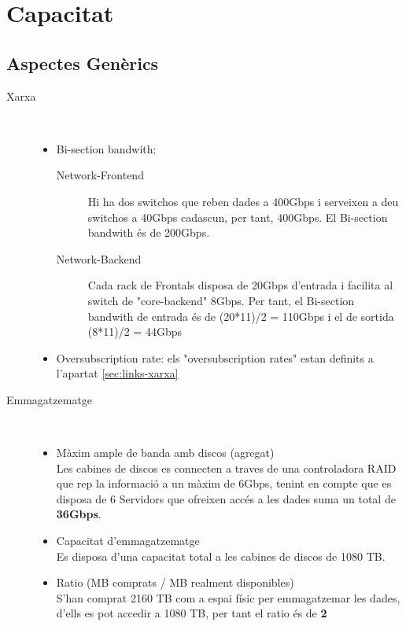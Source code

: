 \section{Capacitat}

\subsection{Aspectes Genèrics}

\begin{description}
    \item[Xarxa] \hfill \\
        \vspace{-5mm}
        \begin{itemize}[leftmargin=*]
            \item Bi-section bandwith:
                \begin{description}
                    \item[Network-Frontend] Hi ha dos switchos que reben dades a 400Gbps i serveixen a deu switchos a 40Gbps cadascun, per tant, 400Gbps. El Bi-section bandwith és de 200Gbps.
                    \item[Network-Backend] Cada rack de Frontals disposa de 20Gbps d'entrada i facilita al switch de "core-backend" 8Gbps. Per tant, el Bi-section bandwith de entrada és de (20*11)/2 = 110Gbps i el de sortida (8*11)/2 = 44Gbps
                \end{description}
            \item Oversubscription rate: els "oversubscription rates" estan definits a l'apartat \ref{sec:links-xarxa}
        \end{itemize}
        
    \item[Emmagatzematge] \hfill \\
        \vspace{-5mm}
        \begin{itemize}[leftmargin=*]
            \item Màxim ample de banda amb discos (agregat) \\
            Les cabines de discos es connecten a traves de una controladora RAID que rep la informació a un màxim de 6Gbps, tenint en compte que es disposa de 6 Servidors que ofreixen accés a les dades suma un total de \textbf{36Gbps}.
            \item Capacitat d'emmagatzematge \\
            Es disposa d'una capacitat total a les cabines de discos de 1080 TB.
            \item Ratio (MB comprats / MB realment disponibles) \\
            S'han comprat 2160 TB com a espai físic per emmagatzemar les dades, d'ells es pot accedir a 1080 TB, per tant el ratio és de \textbf{2}
        \end{itemize}
        

\end{description}

